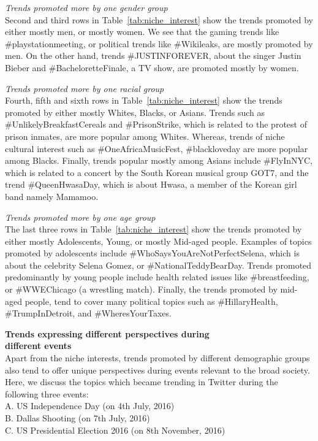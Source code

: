 \documentclass[letterpaper]{article}
\begin{document}
\vspace{1mm}
\noindent \textit{Trends promoted more by one gender group}\\
Second and third rows in Table~\ref{tab:niche_interest} show the trends promoted by either mostly men, or mostly women.
We see that the gaming trends like \#playstationmeeting, or political trends like \#Wikileaks, are mostly promoted by men.
On the other hand, trends \#JUSTINFOREVER, about the singer Justin Bieber and \#BacheloretteFinale, a TV show, are promoted mostly by women.

\vspace{1mm}
\noindent \textit{Trends promoted more by one racial group}\\
Fourth, fifth and sixth rows in Table~\ref{tab:niche_interest} show the trends promoted by either mostly Whites, Blacks, or  Asians.
Trends such as \#UnlikelyBreakfastCereals and \#PrisonStrike, which is related to the protest of prison inmates, are more popular among Whites.
Whereas, trends of niche cultural interest such as \#OneAfricaMusicFest, \#blackloveday are more popular among Blacks. Finally, trends popular mostly among Asians include \#FlyInNYC, which is related to
a concert by the South Korean musical group GOT7, and the trend \#QueenHwasaDay, which is about Hwasa,
a member of the Korean girl band namely Mamamoo.

\vspace{1mm}
\noindent \textit{Trends promoted more by one age group}\\
The last three rows in Table~\ref{tab:niche_interest} show the trends promoted by either mostly Adolescents, Young, or mostly Mid-aged people.
 Examples of topics promoted by adolescents include
\#WhoSaysYouAreNotPerfectSelena, which is about the celebrity Selena Gomez, or \#NationalTeddyBearDay.
Trends promoted predominantly by young people include  
health related issues like \#breastfeeding, or \#WWEChicago (a wrestling match). Finally,
the trends promoted by mid-aged people, tend to cover
many political topics such as \#HillaryHealth, \#TrumpInDetroit, and \#WheresYourTaxes.

\vspace{1mm}
\noindent \textbf{Trends expressing different perspectives during \\ different events} \\
Apart from the niche interests, trends promoted by different demographic groups 
also tend to offer unique perspectives during events relevant to the broad society. 
Here, we discuss the topics which became trending in Twitter during the following three events: \\
A. US Independence Day (on 4th July, 2016) \\
B. Dallas Shooting (on 7th July, 2016) \\
C. US Presidential Election 2016 (on 8th November, 2016) \\
\end{document}
